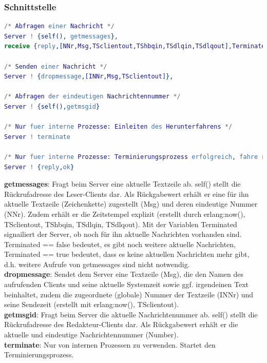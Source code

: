 \documentclass{article}
\begin{document}
\subsubsection{Schnittstelle}
\begin{lstlisting}[language=erlang]
/* Abfragen einer Nachricht */
Server ! {self(), getmessages},
receive {reply,[NNr,Msg,TSclientout,TShbqin,TSdlqin,TSdlqout],Terminated}

/* Senden einer Nachricht */
Server ! {dropmessage,[INNr,Msg,TSclientout]},

/* Abfragen der eindeutigen Nachrichtennummer */
Server ! {self(),getmsgid}

/* Nur fuer interne Prozesse: Einleiten des Herunterfahrens */
Server ! terminate

/* Nur fuer interne Prozesse: Terminierungsprozess erfolgreich, fahre runter*/
Server ! {reply,ok}
\end{lstlisting}

\textbf{getmessages}: Fragt beim Server eine aktuelle Textzeile ab. self() stellt die Rückrufadresse des Leser-Clients dar. Als Rückgabewert erhält er eine für ihn aktuelle Textzeile (Zeichenkette) zugestellt (Msg) und deren eindeutige Nummer (NNr).
Zudem erhält er die Zeitstempel explizit (erstellt durch erlang:now(), TSclientout, TShbqin, TSdlqin, TSdlqout).
Mit der Variablen Terminated signailiert der Server, ob noch für ihn aktuelle Nachrichten vorhanden sind. Terminated == false bedeutet, es gibt noch weitere aktuelle Nachrichten, Terminated == true bedeutet, dass es keine aktuellen Nachrichten mehr gibt, d.h. weitere Aufrufe von getmessages sind nicht notwendig.\\

\textbf{dropmessage}: Sendet dem Server eine Textzeile (Msg), die den  Namen des aufrufenden Clients und seine aktuelle Systemzeit sowie ggf. irgendeinen Text beinhaltet, zudem die zugeordnete (globale) Nummer der Textzeile (INNr) und seine Sendezeit (erstellt mit erlang:now(), TSclientout).\\

\textbf{getmsgid}: Fragt beim Server die aktuelle Nachrichtenummer ab. self() stellt die Rückrufadresse des Redakteur-Clients dar. Als Rückgabewert erhält er die aktuelle und eindeutige Nachrichtennummer (Number).\\

\textbf{terminate}: Nur von internen Prozessen zu verwenden. Startet den Terminierungsprozess.\\
\end{document}
